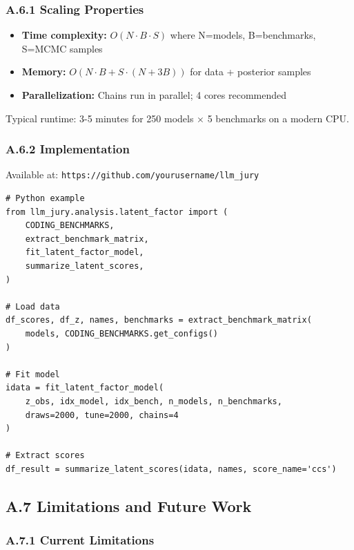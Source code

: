 \subsubsection*{A.6.1 Scaling Properties}

\begin{itemize}
    \item \textbf{Time complexity:} $O(N \cdot B \cdot S)$ where N=models, B=benchmarks, S=MCMC samples
    \item \textbf{Memory:} $O(N \cdot B + S \cdot (N + 3B))$ for data + posterior samples
    \item \textbf{Parallelization:} Chains run in parallel; 4 cores recommended
\end{itemize}

Typical runtime: 3-5 minutes for 250 models $\times$ 5 benchmarks on a modern CPU.

\subsubsection*{A.6.2 Implementation}

Available at: \texttt{https://github.com/yourusername/llm\_jury}

\begin{verbatim}
# Python example
from llm_jury.analysis.latent_factor import (
    CODING_BENCHMARKS,
    extract_benchmark_matrix,
    fit_latent_factor_model,
    summarize_latent_scores,
)

# Load data
df_scores, df_z, names, benchmarks = extract_benchmark_matrix(
    models, CODING_BENCHMARKS.get_configs()
)

# Fit model
idata = fit_latent_factor_model(
    z_obs, idx_model, idx_bench, n_models, n_benchmarks,
    draws=2000, tune=2000, chains=4
)

# Extract scores
df_result = summarize_latent_scores(idata, names, score_name='ccs')
\end{verbatim}

\subsection*{A.7 Limitations and Future Work}

\subsubsection*{A.7.1 Current Limitations}

